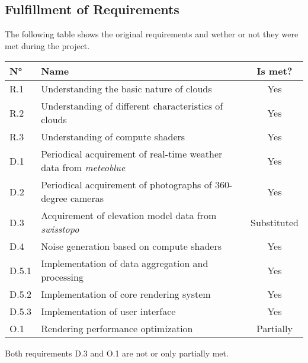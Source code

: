 \subsection{Fulfillment of Requirements}
\label{section:project:requirements}
The following table shows the original requirements and wether or not they were met during the project.
\emptyline
\begin{tabularx}{\textwidth}{|l|X|c|}
    \hline
    \textbf{N°} & \textbf{Name}                                                         & \textbf{Is met?} \\ \hline
    R.1             & Understanding the basic nature of clouds                              & Yes                 \\ \hline
    R.2             & Understanding of different characteristics of clouds                  & Yes                 \\ \hline
    R.3             & Understanding of compute shaders                                      & Yes                 \\ \hline
    D.1             & Periodical acquirement of real-time weather data from \emph{meteoblue}& Yes                 \\ \hline
    D.2             & Periodical acquirement of photographs of 360-degree cameras           & Yes                 \\ \hline
    D.3             & Acquirement of elevation model data from \emph{swisstopo}             & Substituted                  \\ \hline
    D.4             & Noise generation based on compute shaders                             & Yes                 \\ \hline
    D.5.1           & Implementation of data aggregation and processing                     & Yes                 \\ \hline
    D.5.2           & Implementation of core rendering system                               & Yes                 \\ \hline
    D.5.3           & Implementation of user interface                                      & Yes                 \\ \hline
    O.1             & Rendering performance optimization                                    & Partially           \\ \hline
\end{tabularx}
\emptyline
Both requirements D.3 and O.1 are not or only partially met.

